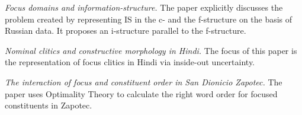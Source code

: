 \documentclass[output=paper,hidelinks]{langscibook}
\begin{document}
\vspace{+6pt}
\citet{King1997} \textit{Focus domains and information-structure.} The paper explicitly discusses the problem created by representing IS in the c- and the f-structure on the basis of Russian data. It proposes an i-structure parallel to the f-structure.  


\vspace{+6pt} 
\citet{Sharma99} \textit{Nominal clitics and constructive morphology in Hindi.} The focus of this paper is the representation of focus clitics in Hindi via inside-out uncertainty. 


\vspace{+6pt} 
\citet{Broadwell} \textit{The interaction of focus and constituent order in San Dionicio Zapotec. } The paper uses Optimality Theory to calculate the right word order for focused constituents in Zapotec.

\end{document}
